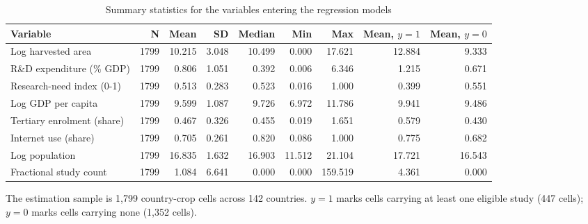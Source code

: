 \begin{table}[!t]
\centering
\caption{Summary statistics for the variables entering the regression models}
\label{tab:summstats}
\begin{tabular*}{\textwidth}{@{\extracolsep\fill}l r r r r r r r r@{}}
\toprule
Variable & N & Mean & SD & Median & Min & Max & Mean, $y=1$ & Mean, $y=0$ \\
\midrule
Log harvested area & 1799 & 10.215 & 3.048 & 10.499 & 0.000 & 17.621 & 12.884 & 9.333 \\
R\&D expenditure (\% GDP) & 1799 & 0.806 & 1.051 & 0.392 & 0.006 & 6.346 & 1.215 & 0.671 \\
Research-need index (0-1) & 1799 & 0.513 & 0.283 & 0.523 & 0.016 & 1.000 & 0.399 & 0.551 \\
Log GDP per capita & 1799 & 9.599 & 1.087 & 9.726 & 6.972 & 11.786 & 9.941 & 9.486 \\
Tertiary enrolment (share) & 1799 & 0.467 & 0.326 & 0.455 & 0.019 & 1.651 & 0.579 & 0.430 \\
Internet use (share) & 1799 & 0.705 & 0.261 & 0.820 & 0.086 & 1.000 & 0.775 & 0.682 \\
Log population & 1799 & 16.835 & 1.632 & 16.903 & 11.512 & 21.104 & 17.721 & 16.543 \\
Fractional study count & 1799 & 1.084 & 6.641 & 0.000 & 0.000 & 159.519 & 4.361 & 0.000 \\
\bottomrule
\end{tabular*}
\begin{tablenotes}
\item[] The estimation sample is 1,799 country-crop cells across 142 countries. $y=1$ marks cells carrying at least one eligible study (447 cells); $y=0$ marks cells carrying none (1,352 cells).
\end{tablenotes}
\end{table}
